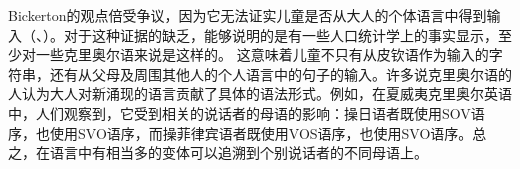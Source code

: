 \addlines
Bickerton的观点倍受争议，因为它无法证实儿童是否从大人的个体语言中得到输入（\citealp[]{Samarin84a}、\citealp[]{Seuren84a}）。对于这种证据的缺乏，能够说明的是有一些人口统计学上的事实显示，至少对一些克里奥尔语来说是这样的\citep{Arends2008a}。
这意味着儿童不只有从皮钦语作为输入的字符串，还有从父母及周围其他人的个人语言中的句子的输入。许多说克里奥尔语的人认为大人对新涌现的语言贡献了具体的语法形式。例如，在夏威夷克里奥尔英语中，人们观察到，它受到相关的说话者的母语的影响：操日语者既使用SOV语序，也使用SVO语序，而操菲律宾语者既使用VOS语序，也使用SVO语序。总之，在语言中有相当多的变体可以追溯到个别说话者的不同母语上。

